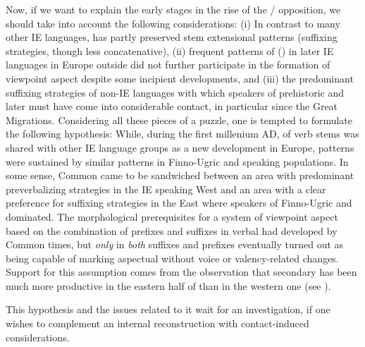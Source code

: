 \documentclass[output=paper]{langsci/langscibook}
\begin{document}
Now, if we want to explain the early stages in the rise of the  / opposition, we should take into account the following considerations: (i) In contrast to many other IE languages,  has partly preserved stem extensional patterns (suffixing strategies, though less concatenative), (ii) frequent patterns of  () in later IE languages in Europe outside  did not further participate in the formation of viewpoint aspect despite some incipient developments, and (iii) the predominant suffixing strategies of non-IE languages with which speakers of prehistoric and later  must have come into considerable contact, in particular since the Great Migrations. Considering all these pieces of a puzzle, one is tempted to formulate the following hypothesis:
\ea
 While, during the first millenium AD,  of verb stems was shared with other IE language groups as a new development in Europe,  patterns were sustained by similar patterns in Finno-Ugric and  speaking populations.
\z
\noindent 
 In some sense, Common  came to be sandwiched between an area with predominant preverbalizing strategies in the IE speaking West and an area with a clear preference for suffixing strategies in the East where speakers of Finno-Ugric and  dominated. The morphological prerequisites for a system of viewpoint aspect based on the combination of prefixes and suffixes in verbal  had developed by Common  times, but \textit{only} in  \textit{both} suffixes and prefixes eventually turned out as being capable of marking aspectual  without voice or valency-related changes. Support for this assumption comes from the observation that secondary  has been much more productive in the eastern half of  than in the western one (see ).

This hypothesis and the issues related to it wait for an investigation, if one wishes to complement an internal reconstruction with contact-induced considerations. 
\end{document}
